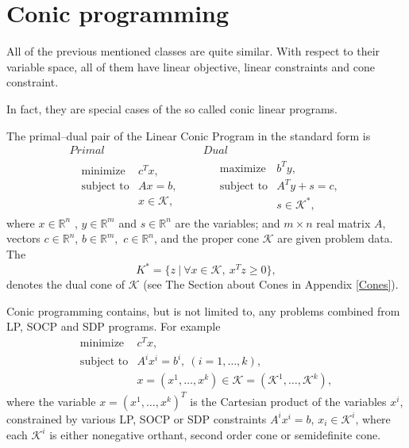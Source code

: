 \documentclass[12pt]{book}
\theoremstyle{definition}
\begin{document}


\section{Conic programming}

All of the previous mentioned classes are quite similar. 
With respect to their variable space, all of them have linear objective, linear constraints and cone constraint.

In fact, they are special cases of the so called conic linear programs.




\label{defConeProg}
The primal--dual pair of the Linear Conic Program in the standard form is  
\begin{equation}
\label{coneProg} 
\begin{array}{cc}
Primal & Dual \\
\ \ \ \begin{array}{ll}
\mbox{minimize} & c^Tx,\\
\mbox{subject to}& Ax = b,\\
& x \in \mathcal{K},
\end{array} 
 \ \ \ \ \ & \ \ \ \ \ 
 \begin{array}{ll}
\mbox{maximize} & b^Ty,\\
\mbox{subject to}& A^Ty + s = c,\\
& s \in \mathcal{K}^*,
\end{array}
\end{array}
\tag{Conic Program}
\end{equation}
where $x\in \mathbb{R}^n$ , $y\in \mathbb{R}^m$ and $s\in \mathbb{R}^n$ are the variables; and $m\times n$ real matrix $A$, vectors $c\in \mathbb{R}^n$, $b\in \mathbb{R}^{m},$ $c\in \mathbb{R}^n$, and the proper cone $\mathcal{K}$ are given problem data. The 
\begin{equation}
{K}^* = \{z\ |\ \forall x\in\mathcal{K}, \ x^Tz\geq 0\},
\end{equation} 
denotes the dual cone of $\mathcal{K}$ (see The Section about Cones in Appendix \ref{Cones}).

Conic programming contains, but is not limited to, any problems combined from LP, SOCP and SDP programs. 
For example 
\begin{equation}
\begin{array}{ll}
\mbox{minimize} & c^Tx,\\
\mbox{subject to}&A^ix^i=b^i, \ (i = 1,\dots ,k),\\
& x=(x^1,\dots ,x^k) \in \mathcal{K} = (\mathcal{K}^1,\dots ,\mathcal{K}^k),
\end{array} 
\end{equation}
where the variable $x=(x^1, \dots, x^k)^T$ is the Cartesian product of the variables $x^i$, constrained by various LP, SOCP or SDP constraints 
$A^ix^i=b$, $x_i\in \mathcal{K}^i$, where each $\mathcal{K}^i$ is either nonegative orthant, second order cone or semidefinite cone.
\end{document}
